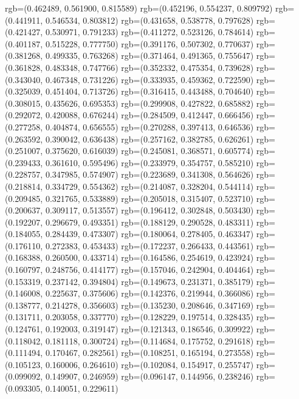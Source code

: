{{{					rgb=(0.462489, 0.561900, 0.815589)
					rgb=(0.452196, 0.554237, 0.809792)
					rgb=(0.441911, 0.546534, 0.803812)
					rgb=(0.431658, 0.538778, 0.797628)
					rgb=(0.421427, 0.530971, 0.791233)
					rgb=(0.411272, 0.523126, 0.784614)
					rgb=(0.401187, 0.515228, 0.777750)
					rgb=(0.391176, 0.507302, 0.770637)
					rgb=(0.381268, 0.499335, 0.763268)
					rgb=(0.371464, 0.491365, 0.755647)
					rgb=(0.361828, 0.483348, 0.747766)
					rgb=(0.352332, 0.475354, 0.739628)
					rgb=(0.343040, 0.467348, 0.731226)
					rgb=(0.333935, 0.459362, 0.722590)
					rgb=(0.325039, 0.451404, 0.713726)
					rgb=(0.316415, 0.443488, 0.704640)
					rgb=(0.308015, 0.435626, 0.695353)
					rgb=(0.299908, 0.427822, 0.685882)
					rgb=(0.292072, 0.420088, 0.676244)
					rgb=(0.284509, 0.412447, 0.666456)
					rgb=(0.277258, 0.404874, 0.656555)
					rgb=(0.270288, 0.397413, 0.646536)
					rgb=(0.263592, 0.390042, 0.636438)
					rgb=(0.257162, 0.382785, 0.626261)
					rgb=(0.251007, 0.375620, 0.616039)
					rgb=(0.245081, 0.368571, 0.605774)
					rgb=(0.239433, 0.361610, 0.595496)
					rgb=(0.233979, 0.354757, 0.585210)
					rgb=(0.228757, 0.347985, 0.574907)
					rgb=(0.223689, 0.341308, 0.564626)
					rgb=(0.218814, 0.334729, 0.554362)
					rgb=(0.214087, 0.328204, 0.544114)
					rgb=(0.209485, 0.321765, 0.533889)
					rgb=(0.205018, 0.315407, 0.523710)
					rgb=(0.200637, 0.309117, 0.513557)
					rgb=(0.196412, 0.302848, 0.503430)
					rgb=(0.192207, 0.296679, 0.493351)
					rgb=(0.188129, 0.290528, 0.483311)
					rgb=(0.184055, 0.284439, 0.473307)
					rgb=(0.180064, 0.278405, 0.463347)
					rgb=(0.176110, 0.272383, 0.453433)
					rgb=(0.172237, 0.266433, 0.443561)
					rgb=(0.168388, 0.260500, 0.433714)
					rgb=(0.164586, 0.254619, 0.423924)
					rgb=(0.160797, 0.248756, 0.414177)
					rgb=(0.157046, 0.242904, 0.404464)
					rgb=(0.153319, 0.237142, 0.394804)
					rgb=(0.149673, 0.231371, 0.385179)
					rgb=(0.146008, 0.225637, 0.375606)
					rgb=(0.142376, 0.219944, 0.366086)
					rgb=(0.138777, 0.214278, 0.356603)
					rgb=(0.135230, 0.208646, 0.347169)
					rgb=(0.131711, 0.203058, 0.337770)
					rgb=(0.128229, 0.197514, 0.328435)
					rgb=(0.124761, 0.192003, 0.319147)
					rgb=(0.121343, 0.186546, 0.309922)
					rgb=(0.118042, 0.181118, 0.300724)
					rgb=(0.114684, 0.175752, 0.291618)
					rgb=(0.111494, 0.170467, 0.282561)
					rgb=(0.108251, 0.165194, 0.273558)
					rgb=(0.105123, 0.160006, 0.264610)
					rgb=(0.102084, 0.154917, 0.255747)
					rgb=(0.099092, 0.149907, 0.246959)
					rgb=(0.096147, 0.144956, 0.238246)
					rgb=(0.093305, 0.140051, 0.229611)
}}}
